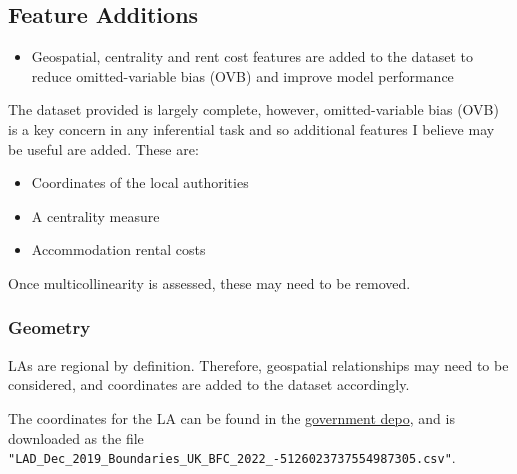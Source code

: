 \documentclass[
  number]{elsarticle}
\providecommand{\tightlist}{%
  \setlength{\itemsep}{0pt}\setlength{\parskip}{0pt}}
\begin{document}
\subsection{Feature Additions}\label{sec-feature-additions}

\begin{tcolorbox}[enhanced jigsaw, colframe=quarto-callout-tip-color-frame, opacityback=0, breakable, toptitle=1mm, titlerule=0mm, coltitle=black, colback=white, bottomtitle=1mm, left=2mm, arc=.35mm, leftrule=.75mm, opacitybacktitle=0.6, bottomrule=.15mm, colbacktitle=quarto-callout-tip-color!10!white, title=\textcolor{quarto-callout-tip-color}{\faLightbulb}\hspace{0.5em}{Subsection Summary}, rightrule=.15mm, toprule=.15mm]

\begin{itemize}
\tightlist
\item
  Geospatial, centrality and rent cost features are added to the dataset
  to reduce omitted-variable bias (OVB) and improve model performance
\end{itemize}

\end{tcolorbox}

The dataset provided is largely complete, however, omitted-variable bias
(OVB) is a key concern in any inferential task and so additional
features I believe may be useful are added. These are:

\begin{itemize}
\tightlist
\item
  Coordinates of the local authorities
\item
  A centrality measure
\item
  Accommodation rental costs
\end{itemize}

Once multicollinearity is assessed, these may need to be removed.

\subsubsection{Geometry}\label{sec-geometry}

LAs are regional by definition. Therefore, geospatial relationships may
need to be considered, and coordinates are added to the dataset
accordingly.

The coordinates for the LA can be found in the
\href{https://geoportal.statistics.gov.uk/datasets/9cb3c710143649499ff6acaca927d205_0/explore}{government
depo}, and is downloaded as the file
\texttt{"LAD\_Dec\_2019\_Boundaries\_UK\_BFC\_2022\_-5126023737554987305.csv"}.
\end{document}
